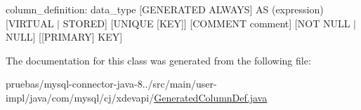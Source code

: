 column\+\_\+definition\+: data\+\_\+type \mbox{[}G\+E\+N\+E\+R\+A\+T\+ED A\+L\+W\+A\+YS\mbox{]} AS (expression) \mbox{[}V\+I\+R\+T\+U\+AL $\vert$ S\+T\+O\+R\+ED\mbox{]} \mbox{[}U\+N\+I\+Q\+UE \mbox{[}K\+EY\mbox{]}\mbox{]} \mbox{[}C\+O\+M\+M\+E\+NT comment\mbox{]} \mbox{[}N\+OT N\+U\+LL $\vert$ N\+U\+LL\mbox{]} \mbox{[}\mbox{[}P\+R\+I\+M\+A\+RY\mbox{]} K\+EY\mbox{]} 

The documentation for this class was generated from the following file\+:\begin{DoxyCompactItemize}
\item 
pruebas/mysql-\/connector-\/java-\/8../src/main/user-\/impl/java/com/mysql/cj/xdevapi/\mbox{\hyperlink{_generated_column_def_8java}{Generated\+Column\+Def.\+java}}\end{DoxyCompactItemize}

